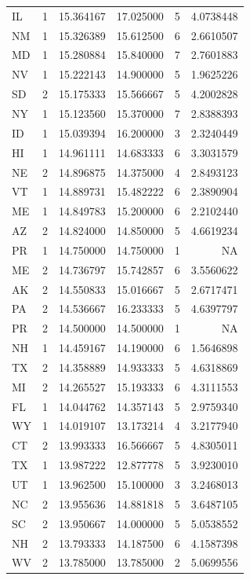 \documentclass[
]{article}
\begin{document}
\begin{longtable}[t]{lrrrrr}
\addlinespace
IL & 1 & 15.364167 & 17.025000 & 5 & 4.0738448\\
NM & 1 & 15.326389 & 15.612500 & 6 & 2.6610507\\
MD & 1 & 15.280884 & 15.840000 & 7 & 2.7601883\\
NV & 1 & 15.222143 & 14.900000 & 5 & 1.9625226\\
SD & 2 & 15.175333 & 15.566667 & 5 & 4.2002828\\
\addlinespace
NY & 1 & 15.123560 & 15.370000 & 7 & 2.8388393\\
ID & 1 & 15.039394 & 16.200000 & 3 & 2.3240449\\
HI & 1 & 14.961111 & 14.683333 & 6 & 3.3031579\\
NE & 2 & 14.896875 & 14.375000 & 4 & 2.8493123\\
VT & 1 & 14.889731 & 15.482222 & 6 & 2.3890904\\
\addlinespace
ME & 1 & 14.849783 & 15.200000 & 6 & 2.2102440\\
AZ & 2 & 14.824000 & 14.850000 & 5 & 4.6619234\\
PR & 1 & 14.750000 & 14.750000 & 1 & NA\\
ME & 2 & 14.736797 & 15.742857 & 6 & 3.5560622\\
AK & 2 & 14.550833 & 15.016667 & 5 & 2.6717471\\
\addlinespace
PA & 2 & 14.536667 & 16.233333 & 5 & 4.6397797\\
PR & 2 & 14.500000 & 14.500000 & 1 & NA\\
NH & 1 & 14.459167 & 14.190000 & 6 & 1.5646898\\
TX & 2 & 14.358889 & 14.933333 & 5 & 4.6318869\\
MI & 2 & 14.265527 & 15.193333 & 6 & 4.3111553\\
\addlinespace
FL & 1 & 14.044762 & 14.357143 & 5 & 2.9759340\\
WY & 1 & 14.019107 & 13.173214 & 4 & 3.2177940\\
CT & 2 & 13.993333 & 16.566667 & 5 & 4.8305011\\
TX & 1 & 13.987222 & 12.877778 & 5 & 3.9230010\\
UT & 1 & 13.962500 & 15.100000 & 3 & 3.2468013\\
\addlinespace
NC & 2 & 13.955636 & 14.881818 & 5 & 3.6487105\\
SC & 2 & 13.950667 & 14.000000 & 5 & 5.0538552\\
NH & 2 & 13.793333 & 14.187500 & 6 & 4.1587398\\
WV & 2 & 13.785000 & 13.785000 & 2 & 5.0699556\\

\end{longtable}
\end{document}
